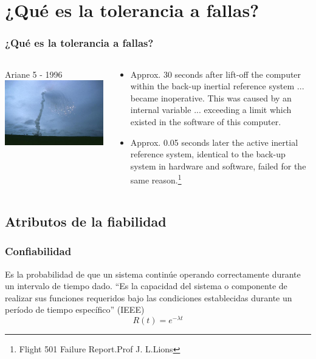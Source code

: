 \section{¿Qué es la tolerancia a fallas?}
\begin{frame}
	\frametitle{¿Qué es la tolerancia a fallas?}
	\begin{columns}[T]
		\begin{column}{.5\textwidth}
			\centering
			Ariane 5 - 1996
			\vfill
			\includegraphics[scale=1]{images/ariane5.jpg}
		\end{column}
		\begin{column}{.5\textwidth}
			\begin{itemize}
				\item Approx. 30 seconds after lift-off the computer within the back-up inertial reference system ... became inoperative. This was caused by an internal variable ... exceeding a limit which existed in the software of this computer.
				\item Approx. 0.05 seconds later the active inertial reference system, identical to the back-up system in hardware and software, failed for the same reason.\footnote{Flight 501 Failure Report.Prof J. L.Lions}
			\end{itemize}
		\end{column}
	\end{columns}    
\end{frame}

\subsection{Atributos de la fiabilidad}
\begin{frame}
	\frametitle{Confiabilidad}
	Es la probabilidad de que un sistema continúe operando correctamente durante un intervalo de tiempo dado. 
	“Es la capacidad del sistema o componente de realizar sus funciones requeridos bajo las condiciones establecidas durante un período de tiempo específico” (IEEE)
	\LARGE
	$$
	R(t) = e^{-\lambda t }
	$$
\end{frame}

